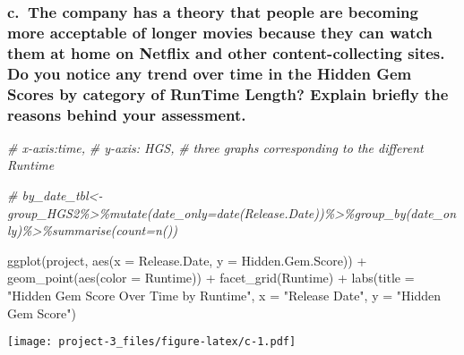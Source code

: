 \documentclass[
]{article}
\newenvironment{Shaded}{\begin{snugshade}}{\end{snugshade}}
\newcommand{\AttributeTok}[1]{\textcolor[rgb]{0.77,0.63,0.00}{#1}}
\newcommand{\CommentTok}[1]{\textcolor[rgb]{0.56,0.35,0.01}{\textit{#1}}}
\newcommand{\FunctionTok}[1]{\textcolor[rgb]{0.00,0.00,0.00}{#1}}
\newcommand{\NormalTok}[1]{#1}
\newcommand{\SpecialCharTok}[1]{\textcolor[rgb]{0.00,0.00,0.00}{#1}}
\newcommand{\StringTok}[1]{\textcolor[rgb]{0.31,0.60,0.02}{#1}}
\begin{document}
\hypertarget{c.-the-company-has-a-theory-that-people-are-becoming-more-acceptable-of-longer-movies-because-they-can-watch-them-at-home-on-netflix-and-other-content-collecting-sites.-do-you-notice-any-trend-over-time-in-the-hidden-gem-scores-by-category-of-runtime-length-explain-briefly-the-reasons-behind-your-assessment.}{%
\subsubsection{c.~The company has a theory that people are becoming more
acceptable of longer movies because they can watch them at home on
Netflix and other content-collecting sites. Do you notice any trend over
time in the Hidden Gem Scores by category of RunTime Length? Explain
briefly the reasons behind your
assessment.}\label{c.-the-company-has-a-theory-that-people-are-becoming-more-acceptable-of-longer-movies-because-they-can-watch-them-at-home-on-netflix-and-other-content-collecting-sites.-do-you-notice-any-trend-over-time-in-the-hidden-gem-scores-by-category-of-runtime-length-explain-briefly-the-reasons-behind-your-assessment.}}

\begin{Shaded}
\begin{Highlighting}[]
\CommentTok{\# x{-}axis:time, }
\CommentTok{\# y{-}axis: HGS, }
\CommentTok{\# three graphs corresponding to the different Runtime}

\CommentTok{\# by\_date\_tbl\textless{}{-}group\_HGS2\%\textgreater{}\%mutate(date\_only=date(Release.Date))\%\textgreater{}\%group\_by(date\_only)\%\textgreater{}\%summarise(count=n())}

\FunctionTok{ggplot}\NormalTok{(project, }\FunctionTok{aes}\NormalTok{(}\AttributeTok{x =}\NormalTok{ Release.Date, }\AttributeTok{y =}\NormalTok{ Hidden.Gem.Score)) }\SpecialCharTok{+} 
  \FunctionTok{geom\_point}\NormalTok{(}\FunctionTok{aes}\NormalTok{(}\AttributeTok{color =}\NormalTok{ Runtime)) }\SpecialCharTok{+} \FunctionTok{facet\_grid}\NormalTok{(}\StringTok{\textquotesingle{}Runtime\textquotesingle{}}\NormalTok{) }\SpecialCharTok{+} \FunctionTok{labs}\NormalTok{(}\AttributeTok{title =} \StringTok{"Hidden Gem Score Over Time by Runtime"}\NormalTok{, }\AttributeTok{x =} \StringTok{"Release Date"}\NormalTok{, }\AttributeTok{y =} \StringTok{"Hidden Gem Score"}\NormalTok{)}
\end{Highlighting}
\end{Shaded}

\texttt{[image: project-3\_files/figure-latex/c-1.pdf]}
\end{document}
